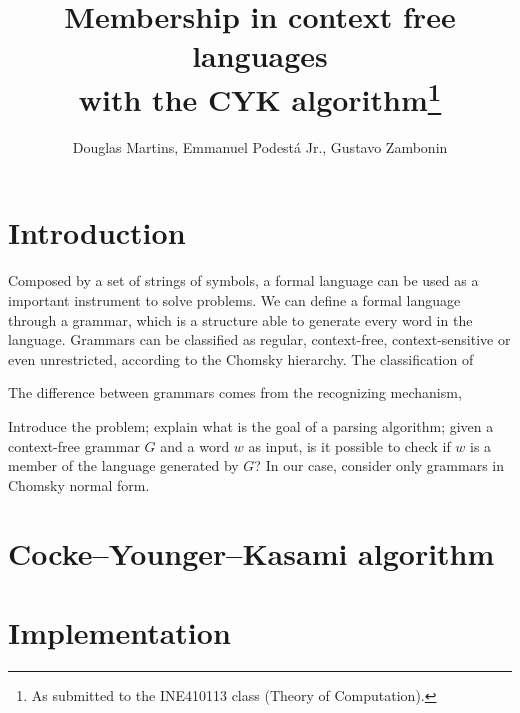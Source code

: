 \documentclass[12pt]{article}
\title{Membership in context free languages \\ with the CYK algorithm\footnote{
    As submitted to the INE410113 class (Theory of Computation).}}
\author{Douglas Martins\inst{1}, Emmanuel Podestá Jr.\inst{1}, Gustavo Zambonin\inst{1}}
\begin{document}
 

\maketitle

\section{Introduction}\label{sec:intro}
Composed by a set of strings of symbols, a formal language can be used as a important instrument to solve problems. We can define a formal language through a grammar, which is a structure able to generate every word in the language. Grammars can be classified as regular, context-free, context-sensitive or even unrestricted, according to the Chomsky hierarchy. The classification of 



The difference between grammars comes from the recognizing mechanism, 


Introduce the problem; explain what is the goal of a parsing algorithm; given a context-free grammar $G$ and a word $w$ as input, is it possible to check if $w$ is a member of the language generated by $G$? In our case, consider only grammars in Chomsky normal form.

\section{Cocke–Younger–Kasami algorithm}\label{sec:cyk}

\section{Implementation}\label{sec:imp}




\end{document}
